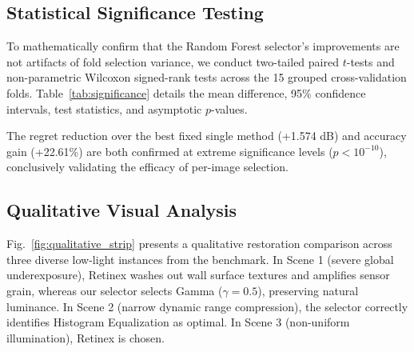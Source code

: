 \documentclass[journal]{IEEEtran}
\begin{document}
\subsection{Statistical Significance Testing}
To mathematically confirm that the Random Forest selector's improvements are not artifacts of fold selection variance, we conduct two-tailed paired $t$-tests and non-parametric Wilcoxon signed-rank tests across the 15 grouped cross-validation folds. Table~\ref{tab:significance} details the mean difference, 95\% confidence intervals, test statistics, and asymptotic $p$-values.

\begin{table}[!t]
\centering
\caption{Statistical Significance Testing across 15 Grouped Cross-Validation Runs (Random Forest vs. Baselines)}
\label{tab:significance}
\end{table}

The regret reduction over the best fixed single method (+1.574 dB) and accuracy gain (+22.61\%) are both confirmed at extreme significance levels ($p < 10^{-10}$), conclusively validating the efficacy of per-image selection.

\subsection{Qualitative Visual Analysis}
Fig.~\ref{fig:qualitative_strip} presents a qualitative restoration comparison across three diverse low-light instances from the benchmark. In Scene 1 (severe global underexposure), Retinex washes out wall surface textures and amplifies sensor grain, whereas our selector selects Gamma ($\gamma=0.5$), preserving natural luminance. In Scene 2 (narrow dynamic range compression), the selector correctly identifies Histogram Equalization as optimal. In Scene 3 (non-uniform illumination), Retinex is chosen.
\end{document}
